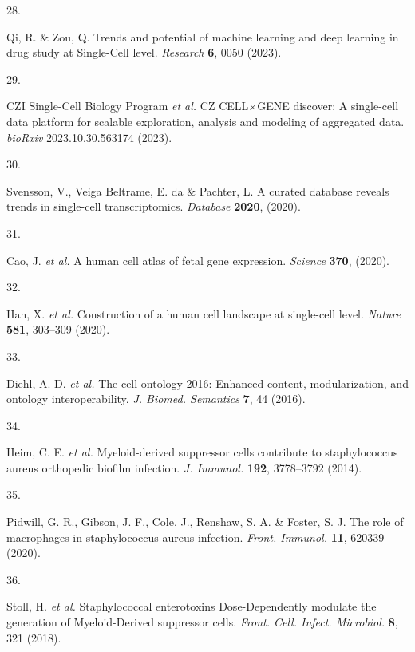 \documentclass[
sn-nature
]{sn-jnl}
\newlength{\cslhangindent}
\newlength{\csllabelwidth}
\newenvironment{CSLReferences}[2] %
 {\begin{list}{}{%
  \setlength{\itemindent}{0pt}
  \setlength{\leftmargin}{0pt}
  \setlength{\parsep}{0pt}
  \ifodd #1
   \setlength{\leftmargin}{\cslhangindent}
   \setlength{\itemindent}{-1\cslhangindent}
  \fi
  \setlength{\itemsep}{#2\baselineskip}}}
 {\end{list}}
\newcommand{\CSLLeftMargin}[1]{\parbox[t]{\csllabelwidth}{\strut#1\strut}}
\newcommand{\CSLRightInline}[1]{\parbox[t]{\linewidth - \csllabelwidth}{\strut#1\strut}}
\begin{document}
\begin{CSLReferences}{0}{0}
\CSLLeftMargin{28. }%
\CSLRightInline{Qi, R. \& Zou, Q. Trends and potential of machine
learning and deep learning in drug study at {Single-Cell} level.
\emph{Research} \textbf{6}, 0050 (2023).}

\CSLLeftMargin{29. }%
\CSLRightInline{CZI Single-Cell Biology Program \emph{et al.} {CZ}
{CELL\(\times\)GENE} discover: A single-cell data platform for scalable
exploration, analysis and modeling of aggregated data. \emph{bioRxiv}
2023.10.30.563174 (2023).}

\CSLLeftMargin{30. }%
\CSLRightInline{Svensson, V., Veiga Beltrame, E. da \& Pachter, L. A
curated database reveals trends in single-cell transcriptomics.
\emph{Database} \textbf{2020}, (2020).}

\CSLLeftMargin{31. }%
\CSLRightInline{Cao, J. \emph{et al.} A human cell atlas of fetal gene
expression. \emph{Science} \textbf{370}, (2020).}

\CSLLeftMargin{32. }%
\CSLRightInline{Han, X. \emph{et al.} Construction of a human cell
landscape at single-cell level. \emph{Nature} \textbf{581}, 303--309
(2020).}

\CSLLeftMargin{33. }%
\CSLRightInline{Diehl, A. D. \emph{et al.} The cell ontology 2016:
Enhanced content, modularization, and ontology interoperability.
\emph{J. Biomed. Semantics} \textbf{7}, 44 (2016).}

\CSLLeftMargin{34. }%
\CSLRightInline{Heim, C. E. \emph{et al.} Myeloid-derived suppressor
cells contribute to staphylococcus aureus orthopedic biofilm infection.
\emph{J. Immunol.} \textbf{192}, 3778--3792 (2014).}

\CSLLeftMargin{35. }%
\CSLRightInline{Pidwill, G. R., Gibson, J. F., Cole, J., Renshaw, S. A.
\& Foster, S. J. The role of macrophages in staphylococcus aureus
infection. \emph{Front. Immunol.} \textbf{11}, 620339 (2020).}

\CSLLeftMargin{36. }%
\CSLRightInline{Stoll, H. \emph{et al.} Staphylococcal enterotoxins
{Dose-Dependently} modulate the generation of {Myeloid-Derived}
suppressor cells. \emph{Front. Cell. Infect. Microbiol.} \textbf{8}, 321
(2018).}


\end{CSLReferences}
\end{document}
